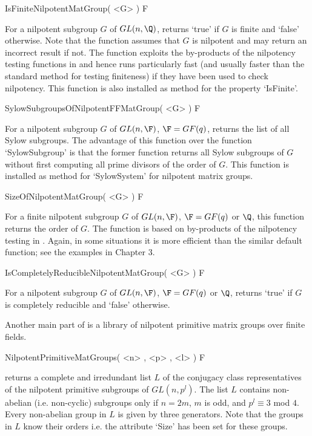 \> IsFiniteNilpotentMatGroup( <G> ) F

For a nilpotent subgroup $G$ of $GL(n,\Q)$, returns `true' if $G$
is finite and `false' otherwise. Note that the function assumes
that $G$ is nilpotent and may return an incorrect result if not.
The function exploits the by-products of the nilpotency testing
functions in  and hence runs particularly fast
(and usually faster than the standard {\GAP} method for testing
finiteness) if they have been used to check nilpotency. This
function is also installed as method for the property `IsFinite'.

\> SylowSubgroupsOfNilpotentFFMatGroup( <G> ) F

For a nilpotent subgroup $G$ of $GL(n,\F)$, $\F=GF(q)$, returns
the list of all Sylow subgroups. The advantage of this function over
the {\GAP} function `SylowSubgroup' is that the former function
returns all Sylow subgroups of $G$ without first computing all prime
divisors of the order of $G$. This function is installed as method
for `SylowSystem' for nilpotent matrix groups.

\> SizeOfNilpotentMatGroup( <G> ) F

For a finite nilpotent subgroup $G$ of $GL(n,\F)$, $\F=GF(q)$ or $\Q$, this
function returns the order of $G$. The function is based on by-products of
the nilpotency testing in . Again, in some situations it is
more efficient than the similar default {\GAP} function; see the examples
in Chapter 3.

\> IsCompletelyReducibleNilpotentMatGroup( <G> ) F

For a nilpotent subgroup $G$ of $GL(n,\F)$, $\F=GF(q)$ or $\Q$, returns
`true' if $G$ is completely reducible and `false' otherwise.


Another main part of  is a library of nilpotent
primitive matrix groups over finite fields.

\> NilpotentPrimitiveMatGroups( <n> , <p> , <l> ) F

returns a complete and irredundant list $L$ of the conjugacy class
representatives of the nilpotent primitive subgroups of $GL(n,p^l)$.
The list $L$ contains non-abelian (i.e. non-cyclic) subgroups only
if $n=2m$, $m$ is odd, and $p^l \equiv 3$ mod $4$. Every non-abelian
group in $L$ is given by three generators. Note that the groups in
$L$ know their orders i.e. the attribute `Size' has been set for these
groups.

